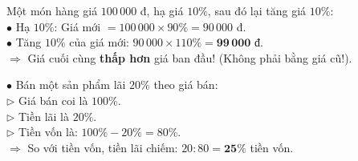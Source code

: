 \documentclass[14pt,a4paper,oneside]{extbook}
\begin{document}
\noindent
\begin{minipage}[t]{0.52\textwidth}
  \begin{tcolorbox}[
    enhanced,
    title={\footnotesize\bfseries\color{white}\faLineChart\ 2. Bài toán tăng/giảm giá 2 lần liên tiếp},
    colback=teal!2!white,
    colframe=teal!75!black,
    arc=2.5mm, boxrule=0.8pt, top=1.8mm, bottom=1.8mm, left=2.2mm, right=2.2mm
  ]
    \footnotesize
    Một món hàng giá $100\,000$ đ, hạ giá $10\%$, sau đó lại tăng giá $10\%$:\\
    $\bullet$ Hạ $10\%$: Giá mới $= 100\,000 \times 90\% = 90\,000$ đ.\\
    $\bullet$ Tăng $10\%$ của giá mới: $90\,000 \times 110\% = \mathbf{99\,000\text{ đ}}$.\\
    $\Rightarrow$ Giá cuối cùng \textbf{thấp hơn} giá ban đầu! (Không phải bằng giá cũ!).
  \end{tcolorbox}
\end{minipage}%
\hfill
\begin{minipage}[t]{0.46\textwidth}
  \begin{tcolorbox}[
    enhanced,
    title={\footnotesize\bfseries\color{white}\faSliders\ 3. Tỉ số phần trăm theo tiền vốn},
    colback=purple!2!white,
    colframe=purple!70!black,
    arc=2.5mm, boxrule=0.8pt, top=1.8mm, bottom=1.8mm, left=2mm, right=2mm
  ]
    \footnotesize
    $\bullet$ Bán một sản phẩm lãi $20\%$ theo giá bán:\\
    $\triangleright$ Giá bán coi là $100\%$.\\
    $\triangleright$ Tiền lãi là $20\%$.\\
    $\triangleright$ Tiền vốn là: $100\% - 20\% = 80\%$.\\
    $\Rightarrow$ So với tiền vốn, tiền lãi chiếm: $20 : 80 = \mathbf{25\%}$ tiền vốn.
  \end{tcolorbox}
\end{minipage}

\vspace{3mm}
\end{document}

